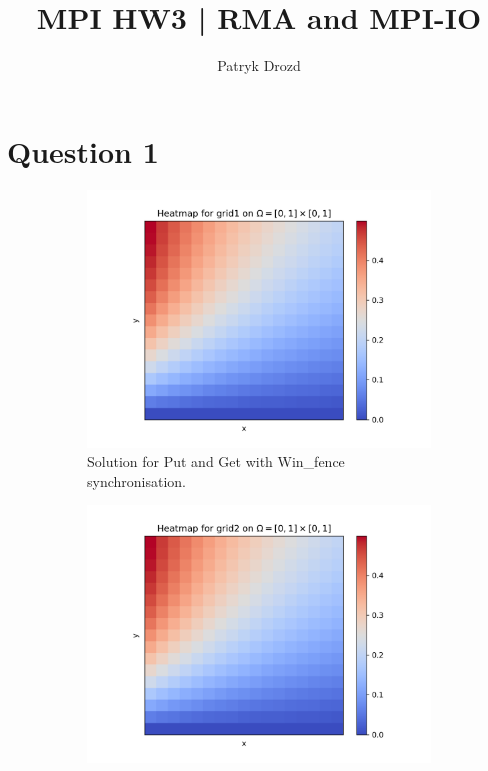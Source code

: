 \documentclass[a4paper]{article}
\title{MPI HW3 | RMA and MPI-IO}
\author{Patryk Drozd}
\begin{document}
\date{}
\maketitle

\section*{Question 1}

	

	\begin{figure}[h!]
		\centering

		\begin{subfigure}[b]{0.32\textwidth}
			\includegraphics[width=\textwidth]{./../q1/plots/heatmap_plot1.png}
			\caption{Solution for Put and Get with Win\_fence synchronisation.}
			\label{fig:1}
		\end{subfigure}
		\hfill
		\begin{subfigure}[b]{0.32\textwidth}
			\includegraphics[width=\textwidth]{./../q1/plots/heatmap_plot2.png}

\end{subfigure}
\end{figure}
\end{document}
